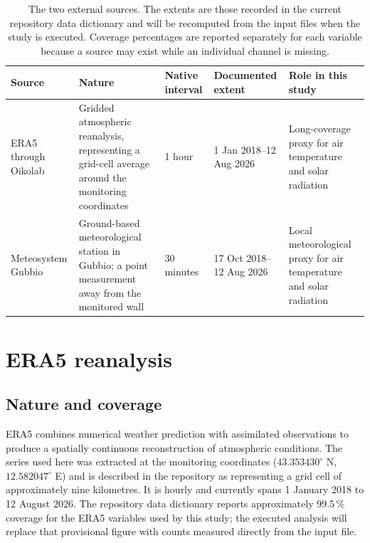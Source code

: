 \documentclass[11pt,a4paper]{article}
\begin{document}
\begin{table}[H]
\centering
\small
\begin{tabularx}{\textwidth}{L{2.1cm}L{3.0cm}L{2.0cm}L{2.4cm}Y}
\toprule
\textbf{Source} & \textbf{Nature} & \textbf{Native interval} &
\textbf{Documented extent} & \textbf{Role in this study} \\
\midrule
ERA5 through Oikolab & Gridded atmospheric reanalysis, representing a grid-cell
average around the monitoring coordinates & 1 hour &
1 Jan 2018--12 Aug 2026 & Long-coverage proxy for air temperature and solar
radiation \\
Meteosystem Gubbio & Ground-based meteorological station in Gubbio; a point
measurement away from the monitored wall & 30 minutes &
17 Oct 2018--12 Aug 2026 & Local meteorological proxy for air temperature and
solar radiation \\
\bottomrule
\end{tabularx}
\caption{The two external sources. The extents are those recorded in the current
repository data dictionary and will be recomputed from the input files when the
study is executed. Coverage percentages are reported separately for each
variable because a source may exist while an individual channel is missing.}
\label{tab:external_sources}
\end{table}


\section{ERA5 reanalysis}
\label{sec:era5}

\subsection{Nature and coverage}

ERA5 combines numerical weather prediction with assimilated observations to
produce a spatially continuous reconstruction of atmospheric conditions. The
series used here was extracted at the monitoring coordinates
($43.353430^{\circ}$ N, $12.582047^{\circ}$ E) and is described in the
repository as representing a grid cell of approximately nine kilometres. It is
hourly and currently spans 1 January 2018 to 12 August 2026. The repository data
dictionary reports approximately 99.5\,\% coverage for the ERA5 variables used
by this study; the executed analysis will replace that provisional figure with
counts measured directly from the input file.
\end{document}

